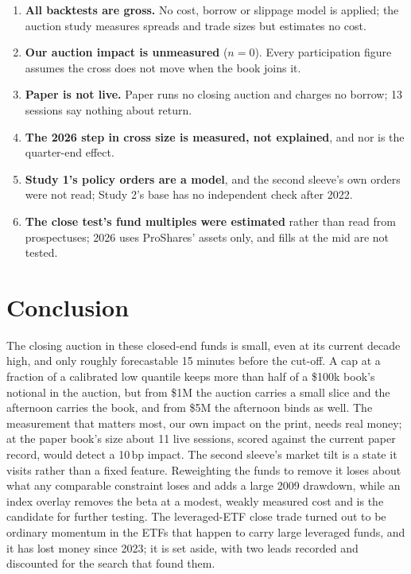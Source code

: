 \documentclass[10pt, a4paper, twocolumn]{article}
\begin{document}
\begin{enumerate}[nosep,leftmargin=*]
    \item \textbf{All backtests are gross.} No cost, borrow or slippage model is applied; the auction study measures spreads and trade sizes but estimates no cost.
    \item \textbf{Our auction impact is unmeasured} ($n = 0$). Every participation figure assumes the cross does not move when the book joins it.
    \item \textbf{Paper is not live.} Paper runs no closing auction and charges no borrow; 13 sessions say nothing about return.
    \item \textbf{The 2026 step in cross size is measured, not explained}, and nor is the quarter-end effect.
    \item \textbf{Study 1's policy orders are a model}, and the second sleeve's own orders were not read; Study 2's base has no independent check after 2022.
    \item \textbf{The close test's fund multiples were estimated} rather than read from prospectuses; 2026 uses ProShares' assets only, and fills at the mid are not tested.
\end{enumerate}

\section{Conclusion}
\label{sec:conclusion}

The closing auction in these closed-end funds is small, even at its current decade high, and only roughly forecastable 15 minutes before the cut-off. A cap at a fraction of a calibrated low quantile keeps more than half of a \$100k book's notional in the auction, but from \$1M the auction carries a small slice and the afternoon carries the book, and from \$5M the afternoon binds as well. The measurement that matters most, our own impact on the print, needs real money; at the paper book's size about 11 live sessions, scored against the current paper record, would detect a 10\,bp impact. The second sleeve's market tilt is a state it visits rather than a fixed feature. Reweighting the funds to remove it loses about what any comparable constraint loses and adds a large 2009 drawdown, while an index overlay removes the beta at a modest, weakly measured cost and is the candidate for further testing. The leveraged-ETF close trade turned out to be ordinary momentum in the ETFs that happen to carry large leveraged funds, and it has lost money since 2023; it is set aside, with two leads recorded and discounted for the search that found them.
\end{document}
